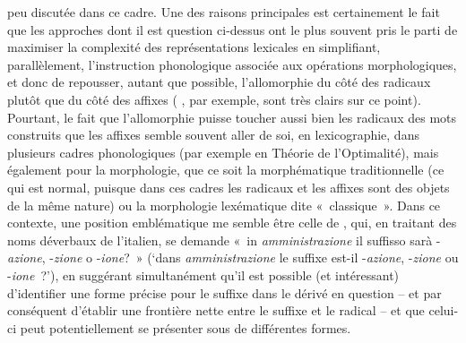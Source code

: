 \documentclass[output=paper]{langsci/langscibook}
\begin{document}
peu discutée dans ce cadre. Une des raisons principales est certainement
le fait que les approches dont il est question ci-dessus ont le plus
souvent pris le parti de maximiser la complexité des représentations
lexicales en simplifiant, parallèlement, l'instruction phonologique
associée aux opérations morphologiques, et donc de repousser, autant que
possible, l'allomorphie du côté des radicaux plutôt que du côté des
affixes (%
\citealt{Bonami2009b}%
%
, par exemple, sont très clairs sur ce
point). Pourtant, le fait que l'allomorphie puisse toucher aussi bien
les radicaux des mots construits que les affixes semble souvent aller de
soi, en lexicographie, dans plusieurs cadres phonologiques (par exemple
en Théorie de l'Optimalité), mais également pour la morphologie, que ce
soit la morphématique traditionnelle (ce qui est normal, puisque dans
ces cadres les radicaux et les affixes sont des objets de la même
nature) ou la morphologie lexématique dite «~classique~». Dans ce
contexte, une position emblématique me semble être celle de %
\citet{Scalise1999}%
%
, qui, en traitant des noms déverbaux de l'italien, se demande
«~in \emph{amministrazione} il suffisso sarà -\emph{azione},
-\emph{zione} o -\emph{ione}?~» (`dans \emph{amministrazione} le suffixe
est-il -\emph{azione}, -\emph{zione} ou -\emph{ione}~?'), en suggérant
simultanément qu'il est possible (et intéressant) d'identifier une forme
précise pour le suffixe dans le dérivé en question -- et par conséquent
d'établir une frontière nette entre le suffixe et le radical -- et que
celui-ci peut potentiellement se présenter sous de différentes formes.
\end{document}
